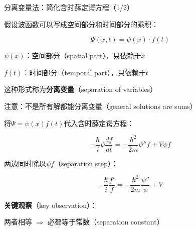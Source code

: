 \documentclass[aspectratio=169,11pt]{beamer}
\begin{document}
\begin{frame}{分离变量法：简化含时薛定谔方程（1/2）}
{    
    \begin{iqbitemize}
    \item 假设波函数可以写成空间部分和时间部分的乘积：
    \end{iqbitemize}
      \[
        \boxed{\Psi(x,t) = \psi(x) \cdot f(t)}
      \]
    \begin{iqbitemize}
      \item $\psi(x)$：空间部分（spatial part），只依赖于$x$
      \item $f(t)$：时间部分（temporal part），只依赖于$t$
      \item 这种形式称为\textbf{分离变量}（separation of variables）
      \item 注意：不是所有解都能分离变量（general solutions are sums）
    \end{iqbitemize}
  }{
    \begin{iqbitemize}
    \item 将$\Psi = \psi(x) f(t)$代入含时薛定谔方程：
    \end{iqbitemize}
      \footnotesize
      \[
        -\dfrac{\hbar}{i}\psi\dfrac{df}{dt} = -\dfrac{\hbar^2}{2m}\psi'' f + V\psi f
      \]
    \begin{iqbitemize}
      \item 两边同时除以$\psi f$（separation step）：
    \end{iqbitemize}
      \footnotesize
      \[
        -\dfrac{\hbar}{i}\dfrac{f'}{f} = -\dfrac{\hbar^2}{2m}\dfrac{\psi''}{\psi} + V
      \]
    \begin{iqbitemize}
      \item \textbf{关键观察}（key observation）：
      \item 两者相等 $\Rightarrow$ 必都等于常数（separation constant）
    \end{iqbitemize}
  }
\end{frame}
\end{document}
